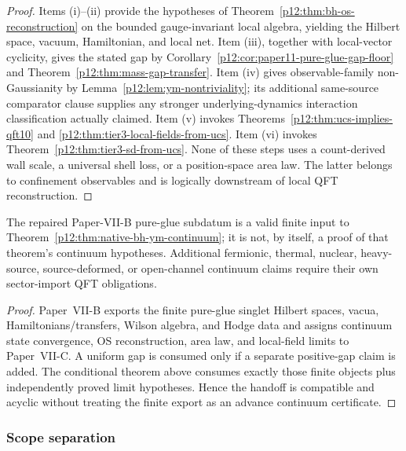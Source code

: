 \documentclass[12pt,a4paper]{article}
\begin{document}
\begin{proof}
Items (i)--(ii) provide the hypotheses of Theorem~\ref{p12:thm:bh-os-reconstruction} on the bounded gauge-invariant local algebra, yielding the Hilbert space, vacuum, Hamiltonian, and local net.  Item (iii), together with local-vector cyclicity, gives the stated gap by Corollary~\ref{p12:cor:paper11-pure-glue-gap-floor} and Theorem~\ref{p12:thm:mass-gap-transfer}.  Item (iv) gives observable-family non-Gaussianity by Lemma~\ref{p12:lem:ym-nontriviality}; its additional same-source comparator clause supplies any stronger underlying-dynamics interaction classification actually claimed.  Item (v) invokes Theorems~\ref{p12:thm:ucs-implies-qft10} and \ref{p12:thm:tier3-local-fields-from-ucs}.  Item (vi) invokes Theorem~\ref{p12:thm:tier3-sd-from-ucs}.  None of these steps uses a count-derived wall scale, a universal shell loss, or a position-space area law.  The latter belongs to confinement observables and is logically downstream of local QFT reconstruction.
\end{proof}



\begin{corollary}
\label{p12:cor:p11-final-export-compatibility}
The repaired Paper-VII-B pure-glue subdatum is a valid finite input to Theorem~\ref{p12:thm:native-bh-ym-continuum}; it is not, by itself, a proof of that theorem's continuum hypotheses.  Additional fermionic, thermal, nuclear, heavy-source, source-deformed, or open-channel continuum claims require their own sector-import QFT obligations.
\end{corollary}
\begin{proof}
Paper~VII-B exports the finite pure-glue singlet Hilbert spaces, vacua, Hamiltonians/transfers, Wilson algebra, and Hodge data and assigns continuum state convergence, OS reconstruction, area law, and local-field limits to Paper~VII-C.  A uniform gap is consumed only if a separate positive-gap claim is added.  The conditional theorem above consumes exactly those finite objects plus independently proved limit hypotheses.  Hence the handoff is compatible and acyclic without treating the finite export as an advance continuum certificate.
\end{proof}



\subsubsection{Scope separation}
\label{p12:subsec:tier4-scope-closure}
\end{document}
